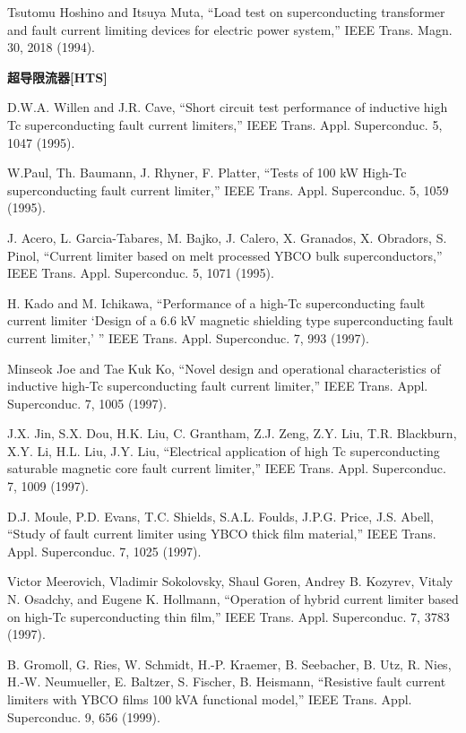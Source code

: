 \noindent [9.115] Tsutomu Hoshino and Itsuya Muta, ``Load test on superconducting transformer
and fault current limiting devices for electric power system,” IEEE Trans. Magn.
30, 2018 (1994).

\noindent \textbf{超导限流器[HTS] }

\noindent [9.116] D.W.A. Willen and J.R. Cave, ``Short circuit test performance of inductive high
Tc superconducting fault current limiters,” IEEE Trans. Appl. Superconduc. 5,
1047 (1995).

\noindent [9.117] W.Paul, Th. Baumann, J. Rhyner, F. Platter, ``Tests of 100 kW High-Tc superconducting
fault current limiter,” IEEE Trans. Appl. Superconduc. 5, 1059 (1995).

\noindent [9.118] J. Acero, L. Garcia-Tabares, M. Bajko, J. Calero, X. Granados, X. Obradors,
S. Pinol, ``Current limiter based on melt processed YBCO bulk superconductors,”
IEEE Trans. Appl. Superconduc. 5, 1071 (1995).

\noindent [9.119] H. Kado and M. Ichikawa, ``Performance of a high-Tc superconducting fault current
limiter ‘Design of a 6.6 kV magnetic shielding type superconducting fault
current limiter,’ ” IEEE Trans. Appl. Superconduc. 7, 993 (1997).

\noindent [9.120] Minseok Joe and Tae Kuk Ko, ``Novel design and operational characteristics of
inductive high-Tc superconducting fault current limiter,” IEEE Trans. Appl. Superconduc.
7, 1005 (1997).

\noindent [9.121] J.X. Jin, S.X. Dou, H.K. Liu, C. Grantham, Z.J. Zeng, Z.Y. Liu, T.R. Blackburn,
X.Y. Li, H.L. Liu, J.Y. Liu, ``Electrical application of high Tc superconducting
saturable magnetic core fault current limiter,” IEEE Trans. Appl. Superconduc.
7, 1009 (1997).

\noindent [9.122] D.J. Moule, P.D. Evans, T.C. Shields, S.A.L. Foulds, J.P.G. Price, J.S. Abell,
``Study of fault current limiter using YBCO thick film material,” IEEE Trans.
Appl. Superconduc. 7, 1025 (1997).

\noindent [9.123] Victor Meerovich, Vladimir Sokolovsky, Shaul Goren, Andrey B. Kozyrev, Vitaly
N. Osadchy, and Eugene K. Hollmann, ``Operation of hybrid current limiter based
on high-Tc superconducting thin film,” IEEE Trans. Appl. Superconduc. 7, 3783
(1997).

\noindent [9.124] B. Gromoll, G. Ries, W. Schmidt, H.-P. Kraemer, B. Seebacher, B. Utz, R. Nies,
H.-W. Neumueller, E. Baltzer, S. Fischer, B. Heismann, ``Resistive fault current
limiters with YBCO films 100 kVA functional model,” IEEE Trans. Appl. Superconduc.
9, 656 (1999).

